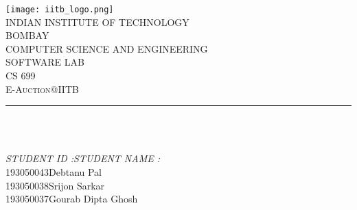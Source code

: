 \documentclass[12pt]{article}
\makeatletter
\let\thetitle\@title
\makeatother
\begin{document}

\begin{titlepage}
	\centering
    \vspace*{0.5 cm}
    \texttt{[image: iitb\_logo.png]}\\[1.0 cm]	%
    {\LARGE INDIAN INSTITUTE OF TECHNOLOGY }\\[1.0 cm]
    {\LARGE BOMBAY}\\[2.0 cm]
    \textsc{\lARGE COMPUTER SCIENCE AND ENGINEERING}\\[0.2 cm]
    \textsc{\lARGE SOFTWARE LAB}\\[0.2 cm]
	\textsc{\Large CS 699}\\[0.5 cm]
	\textsc{\large E-Auction@IITB}\\[0.2 cm]
	\rule{\linewidth}{0.2 mm} \\[0.4 cm]
	{ \huge \bfseries \thetitle}\\
	
	
	\begin{minipage}{0.8\textwidth}
		
			\emph{STUDENT ID :\tab STUDENT NAME :} \\
			193050043\tab Debtanu Pal\\
			193050038\tab Srijon Sarkar\\
			193050037\tab Gourab Dipta Ghosh\\
			
	\end{minipage}\\[2 cm]
	\vfill
\end{titlepage}

\tableofcontents
\pagebreak
\end{document}
